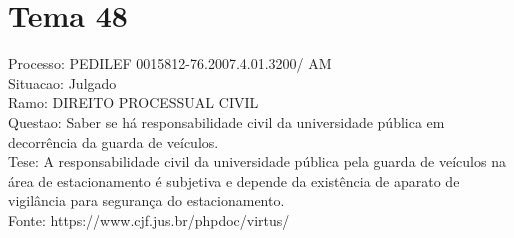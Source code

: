 \documentclass[12pt]{article}
\begin{document}
\section*{Tema 48}
Processo: PEDILEF 0015812-76.2007.4.01.3200/ AM\\
Situacao: Julgado\\
Ramo: DIREITO PROCESSUAL CIVIL\\
Questao: Saber se há responsabilidade civil da universidade pública em decorrência da guarda de veículos.\\
Tese: A responsabilidade civil da universidade pública pela guarda de veículos na área de estacionamento é subjetiva e depende da existência de aparato de vigilância para segurança do estacionamento.\\
Fonte: https://www.cjf.jus.br/phpdoc/virtus/
\end{document}
